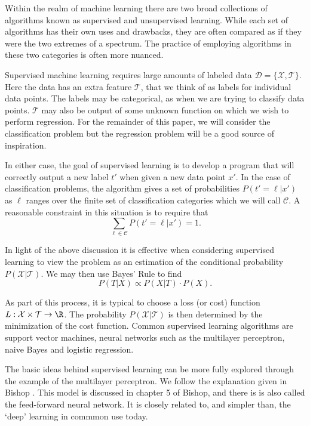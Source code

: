 
Within the realm of machine learning there are two broad collections of 
algorithms known as supervised and unsupervised learning. While each set of 
algorithms has their own uses and drawbacks, they are often compared as if 
they were the two extremes of a spectrum. The practice of employing algorithms 
in these two categories is often more nuanced.

\label{supLearning}
Supervised machine learning requires large amounts of labeled data 
$\mathcal{D}=\{\mathcal{X},\mathcal{T}\}$.  Here the data has an extra feature 
$\mathcal{T}$, that we think of as labels for individual data points.  The 
labels may be categorical, as when we are trying to classify data points.  
$\mathcal{T}$ may also be output of some unknown function on which we wish to 
perform regression. For the remainder of this paper, we will consider the 
classification problem but the regression problem will be a good source of 
inspiration.

In either case, the goal of supervised learning is to develop a program that
will correctly output a new label $t'$ when given a new data point $x'$. 
In the case of classification problems, the algorithm gives a set of 
probabilities $P(t'=\ell|x')$ as $\ell$ ranges over the finite set of 
classification categories which we will call $\mathcal{C}$. A reasonable 
constraint in this situation is to require that 
\[\sum_{\ell\in\mathcal{C}}P(t'=\ell|x') = 1.\]

In light of the above discussion it is effective when considering supervised 
learning to view the problem as an estimation of the conditional probability 
$P(\mathcal{X}|\mathcal{T})$. We may then use Bayes' Rule to find 
\[P(T|X)\propto P(X|T)\cdot P(X).\]

As part of this process, it is typical to choose a loss (or cost) function 
$L:\mathcal{X}\times\mathcal{T}\rightarrow \R$.  The probability 
$P(\mathcal{X}|\mathcal{T})$ is then determined by the minimization of the 
cost function. Common supervised learning algorithms are support vector 
machines, neural networks such as the multilayer perceptron, naive Bayes and 
logistic regression.

The basic ideas behind supervised learning can be more fully explored through 
the example of the multilayer perceptron.  We follow the explanation given in 
Bishop \cite{BishopBook}. This model is discussed in chapter 5 of Bishop, 
and there is is also called the feed-forward neural network. It is closely 
related to, and simpler than, the `deep' learning in commmon use today.

